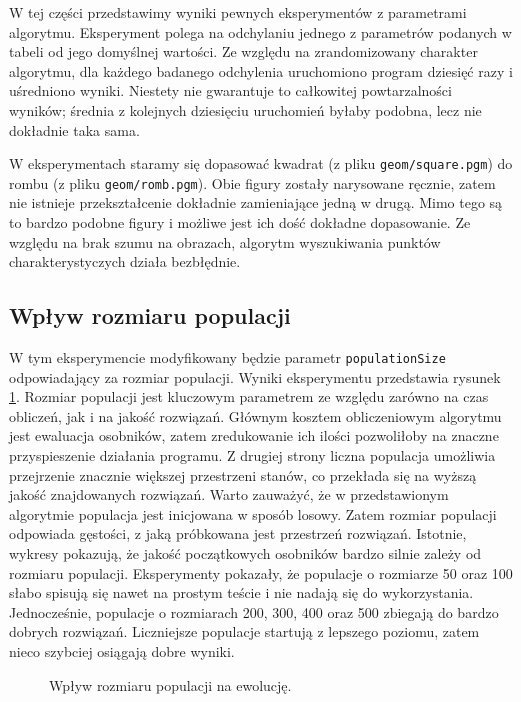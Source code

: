 \documentclass[a4paper,12pt,leqno]{article}
\begin{document}
W tej części przedstawimy wyniki pewnych eksperymentów z parametrami algorytmu. Eksperyment polega na odchylaniu jednego z parametrów podanych w 
tabeli od jego domyślnej wartości. Ze względu na zrandomizowany charakter algorytmu, dla każdego badanego odchylenia uruchomiono program dziesięć
razy i uśredniono wyniki. Niestety nie gwarantuje to całkowitej powtarzalności wyników; średnia z kolejnych dziesięciu uruchomień byłaby podobna,
lecz nie dokładnie taka sama.

W eksperymentach staramy się dopasować kwadrat (z pliku \texttt{geom/square.pgm}) do rombu (z pliku \texttt{geom/romb.pgm}). Obie figury zostały
narysowane ręcznie, zatem nie istnieje przekształcenie dokładnie zamieniające jedną w drugą. Mimo tego są to bardzo podobne figury i możliwe jest
ich dość dokładne dopasowanie. Ze względu na brak szumu na obrazach, algorytm wyszukiwania punktów charakterystyczych działa bezbłędnie.

\subsection{Wpływ rozmiaru populacji}
W tym eksperymencie modyfikowany będzie parametr \texttt{populationSize} odpowiadający za rozmiar populacji. Wyniki eksperymentu przedstawia
rysunek \ref{popsize}. Rozmiar populacji jest kluczowym parametrem ze względu zarówno na czas obliczeń, jak i na jakość rozwiązań. Głównym kosztem
obliczeniowym algorytmu jest ewaluacja osobników, zatem zredukowanie ich ilości pozwoliłoby na znaczne przyspieszenie działania programu. Z drugiej
strony liczna populacja umożliwia przejrzenie znacznie większej przestrzeni stanów, co przekłada się na wyższą jakość znajdowanych rozwiązań.
Warto zauważyć, że w przedstawionym algorytmie populacja jest inicjowana w sposób losowy. Zatem rozmiar populacji odpowiada gęstości, z jaką 
próbkowana jest przestrzeń rozwiązań. Istotnie, wykresy pokazują, że jakość początkowych osobników bardzo silnie zależy od rozmiaru populacji.
Eksperymenty pokazały, że populacje o rozmiarze 50 oraz 100 słabo spisują się nawet na prostym teście i nie nadają się do wykorzystania.
Jednocześnie, populacje o rozmiarach 200, 300, 400 oraz 500 zbiegają do bardzo dobrych rozwiązań. Liczniejsze populacje startują z lepszego
poziomu, zatem nieco szybciej osiągają dobre wyniki.

\begin{figure}\centering
\footnotesize\vspace{-2em}
\normalsize\caption{Wpływ rozmiaru populacji na ewolucję.}\label{popsize}
\end{figure}
\end{document}
